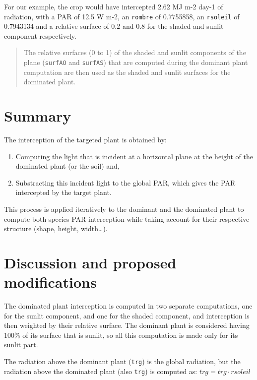 \documentclass[]{book}
\providecommand{\tightlist}{%
  \setlength{\itemsep}{0pt}\setlength{\parskip}{0pt}}
\begin{document}
For our example, the crop would have intercepted 2.62 MJ m-2 day-1 of radiation, with a PAR of 12.5 W m-2, an \texttt{rombre} of 0.7755858, an \texttt{rsoleil} of 0.7943134 and a relative surface of 0.2 and 0.8 for the shaded and sunlit component respectively.

\begin{quote}
The relative surfaces (0 to 1) of the shaded and sunlit components of the plane (\texttt{surfAO} and \texttt{surfAS}) that are computed during the dominant plant computation are then used as the shaded and sunlit surfaces for the dominated plant.
\end{quote}

\hypertarget{summary}{%
\section{Summary}\label{summary}}

The interception of the targeted plant is obtained by:

\begin{enumerate}
\def\labelenumi{\arabic{enumi}.}
\tightlist
\item
  Computing the light that is incident at a horizontal plane at the height of the dominated plant (or the soil) and,
\item
  Substracting this incident light to the global PAR, which gives the PAR intercepted by the target plant.
\end{enumerate}

This process is applied iteratively to the dominant and the dominated plant to compute both species PAR interception while taking account for their respective structure (shape, height, width\ldots{}).

\hypertarget{discussion-and-proposed-modifications}{%
\section{Discussion and proposed modifications}\label{discussion-and-proposed-modifications}}

The dominated plant interception is computed in two separate computations, one for the sunlit component, and one for the shaded component, and interception is then weighted by their relative surface. The dominant plant is considered having 100\% of its surface that is sunlit, so all this computation is made only for its sunlit part.

The radiation above the dominant plant (\texttt{trg}) is the global radiation, but the radiation above the dominated plant (also \texttt{trg}) is computed as:
\(trg=trg\cdot rsoleil\)
\end{document}
